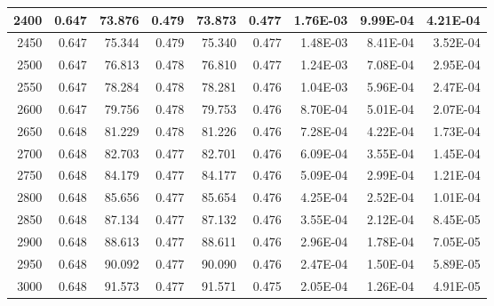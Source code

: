 \begin{table}[htbp]
\begin{tabular}{|r|r|r|r|r|r|r|r|r|}
2400 & 0.647 & 73.876 & 0.479 & 73.873 & 0.477 & 1.76E-03 & 9.99E-04 & 4.21E-04 \\ \hline
2450 & 0.647 & 75.344 & 0.479 & 75.340 & 0.477 & 1.48E-03 & 8.41E-04 & 3.52E-04 \\ \hline
2500 & 0.647 & 76.813 & 0.478 & 76.810 & 0.477 & 1.24E-03 & 7.08E-04 & 2.95E-04 \\ \hline
2550 & 0.647 & 78.284 & 0.478 & 78.281 & 0.476 & 1.04E-03 & 5.96E-04 & 2.47E-04 \\ \hline
2600 & 0.647 & 79.756 & 0.478 & 79.753 & 0.476 & 8.70E-04 & 5.01E-04 & 2.07E-04 \\ \hline
2650 & 0.648 & 81.229 & 0.478 & 81.226 & 0.476 & 7.28E-04 & 4.22E-04 & 1.73E-04 \\ \hline
2700 & 0.648 & 82.703 & 0.477 & 82.701 & 0.476 & 6.09E-04 & 3.55E-04 & 1.45E-04 \\ \hline
2750 & 0.648 & 84.179 & 0.477 & 84.177 & 0.476 & 5.09E-04 & 2.99E-04 & 1.21E-04 \\ \hline
2800 & 0.648 & 85.656 & 0.477 & 85.654 & 0.476 & 4.25E-04 & 2.52E-04 & 1.01E-04 \\ \hline
2850 & 0.648 & 87.134 & 0.477 & 87.132 & 0.476 & 3.55E-04 & 2.12E-04 & 8.45E-05 \\ \hline
2900 & 0.648 & 88.613 & 0.477 & 88.611 & 0.476 & 2.96E-04 & 1.78E-04 & 7.05E-05 \\ \hline
2950 & 0.648 & 90.092 & 0.477 & 90.090 & 0.476 & 2.47E-04 & 1.50E-04 & 5.89E-05 \\ \hline
3000 & 0.648 & 91.573 & 0.477 & 91.571 & 0.475 & 2.05E-04 & 1.26E-04 & 4.91E-05 \\ \hline
\end{tabular}
\label{table:modelparam}
\end{table}




\clearpage
